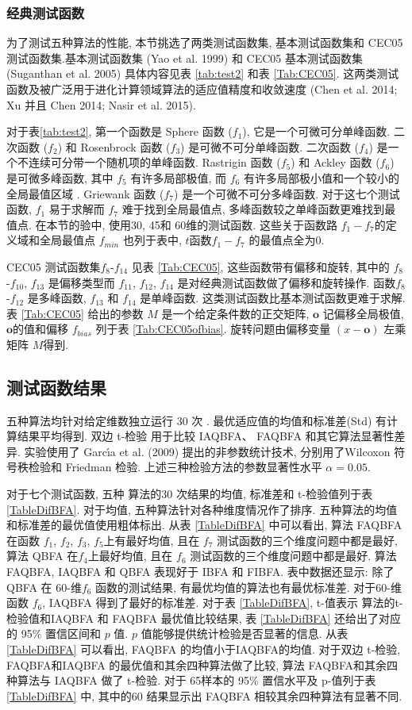 \subsubsection{经典测试函数}
为了测试五种算法的性能, 本节挑选了两类测试函数集, 基本测试函数集和  CEC05 测试函数集.基本测试函数集 (Yao et al. 1999) 和  CEC05 基本测试函数集 (Suganthan et al. 2005) 具体内容见表 \ref{tab:test2} 和表 \ref{Tab:CEC05}. 这两类测试函数及被广泛用于进化计算领域算法的适应值精度和收敛速度 (Chen et al. 2014; Xu 并且 Chen 2014; Nasir et al. 2015).

对于表\ref{tab:test2}, 第一个函数是 Sphere 函数 ($f_1$), 它是一个可微可分单峰函数. 二次函数 ($f_2$) 和 Rosenbrock 函数 ($f_3$) 是可微不可分单峰函数. 二次函数 ($f_4$) 是一个不连续可分带一个随机项的单峰函数. Rastrigin 函数 ($f_5$) 和 Ackley 函数 ($f_6$) 是可微多峰函数, 其中 $f_5$ 有许多局部极值, 而 $f_6$ 有许多局部极小值和一个较小的全局最值区域 . Griewank 函数 ($f_7$) 是一个可微不可分多峰函数. 对于这七个测试函数, $f_1$ 易于求解而 $f_7$ 难于找到全局最值点, 多峰函数较之单峰函数更难找到最值点. 在本节的验中, 使用30, 45和 60维的测试函数. 这些关于函数路 $f_1-f_7$的定义域和全局最值点 $f_{min}$ 也列于表中, $t$函数$f_1-f_7$ 的最值点全为0.

CEC05 测试函数集$f_8$-$f_{14}$ 见表 \ref{Tab:CEC05}, 这些函数带有偏移和旋转, 其中的 $f_8$-$f_{10}$, $f_{13}$ 是偏移类型而 $f_{11}$, $f_{12}$, $f_{14}$ 是对经典测试函数做了偏移和旋转操作. 函数$f_8$-$f_{12}$ 是多峰函数, $f_{13}$ 和 $f_{14}$ 是单峰函数. 这类测试函数比基本测试函数更难于求解. 表 \ref{Tab:CEC05} 给出的参数 $M$ 是一个给定条件数的正交矩阵, $\bm o$ 记偏移全局极值, $\bm o$的值和偏移 $f_{bias}$ 列于表 \ref{Tab:CEC05ofbias}. 旋转问题由偏移变量 $(x-\bm o)$ 左乘矩阵 $M$得到.
\subsection{测试函数结果}
五种算法均针对给定维数独立运行 30 次 . 最优适应值的均值和标准差(Std) 有计算结果平均得到. 双边 t-检验 用于比较 IAQBFA、 FAQBFA 和其它算法显著性差异. 实验使用了 Garc\'{\i}a et al. (2009) 提出的非参数统计技术, 分别用了Wilcoxon 符号秩检验和 Friedman 检验. 上述三种检验方法的参数显著性水平 $\alpha=0.05$.

对于七个测试函数, 五种 算法的30 次结果的均值, 标准差和 t-检验值列于表 \ref{TableDifBFA}. 对于均值, 五种算法针对各种维度情况作了排序. 五种算法的均值和标准差的最优值使用粗体标出. 从表 \ref{TableDifBFA} 中可以看出, 算法 FAQBFA 在函数 $f_1$, $f_2$, $f_3$, $f_5$上有最好均值, 且在 $f_7$ 测试函数的三个维度问题中都是最好, 算法 QBFA 在$f_4$上最好均值, 且在  $f_6$ 测试函数的三个维度问题中都是最好. 算法 FAQBFA, IAQBFA 和 QBFA 表现好于 IBFA 和 FIBFA. 表中数据还显示: 除了 QBFA 在 60-维$f_6$ 函数的测试结果, 有最优均值的算法也有最优标准差. 对于60-维函数 $f_6$, IAQBFA 得到了最好的标准差. 对于表 \ref{TableDifBFA}, t-值表示 算法的t-检验值和IAQBFA 和 FAQBFA 最优值比较结果, 表 \ref{TableDifBFA} 还给出了对应的 95\% 置信区间和 $p$ 值. $p$ 值能够提供统计检验是否显著的信息. 从表 \ref{TableDifBFA} 可以看出, FAQBFA 的均值小于IAQBFA的均值. 对于双边 t-检验, FAQBFA和IAQBFA 的最优值和其余四种算法做了比较, 算法 FAQBFA和其余四种算法与 IAQBFA 做了 t-检验. 对于 65样本的 95\% 置信水平及 p-值列于表 \ref{TableDifBFA} 中, 其中的60 结果显示出 FAQBFA 相较其余四种算法有显著不同.

